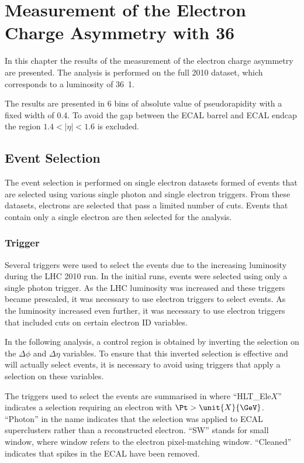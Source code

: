 \chapter[Electron Charge Asymmetry]{Measurement of the Electron Charge Asymmetry
 with \unit{36}{\invpb} }

In this chapter the results of the measurement of the electron charge
asymmetry are presented. The analysis is performed on the full 2010 dataset, which corresponds to a
luminosity of \unit{36.1}{\invpb}.

The results are presented in 6 bins of absolute value of pseudorapidity with a
fixed width of 0.4. To avoid the gap between the ECAL barrel and ECAL endcap the
region $1.4<|\eta|<1.6$ is excluded.

\section{Event Selection}

The event selection is performed on single electron datasets formed of events
that are selected using various single photon and single electron triggers. From
these datasets, electrons are selected that pass a limited number of cuts.
Events that contain only a single electron are then selected for the analysis.

\subsection{Trigger}

Several triggers were used to select the events due to the increasing luminosity
during the \ac{LHC} 2010 run.  In the initial runs, events were selected using
only a single photon trigger.  As the \ac{LHC} luminosity was increased and
these triggers became prescaled, it was necessary to use electron triggers to
select events.  As the luminosity increased even further, it was necessary to use
electron triggers that included cuts on certain electron ID variables.

In the following analysis, a control region is obtained by inverting the
selection on the $\Delta\phi$ and $\Delta\eta$ variables. To ensure that this
inverted selection is effective and will actually select events, it is necessary
to avoid using triggers that apply a selection on these variables.

The triggers used to select the events are summarised in 
where ``HLT\_Ele$X$'' indicates a selection requiring an electron with  $\Pt > \unit{X}{\GeV}$. 
``Photon'' in the name indicates that the selection was applied to ECAL
superclusters rather than a reconstructed electron. 
``SW'' stands for small window, where window refers to the electron
pixel-matching window. 
 ``Cleaned'' indicates that spikes in the \ac{ECAL} have been removed.  

